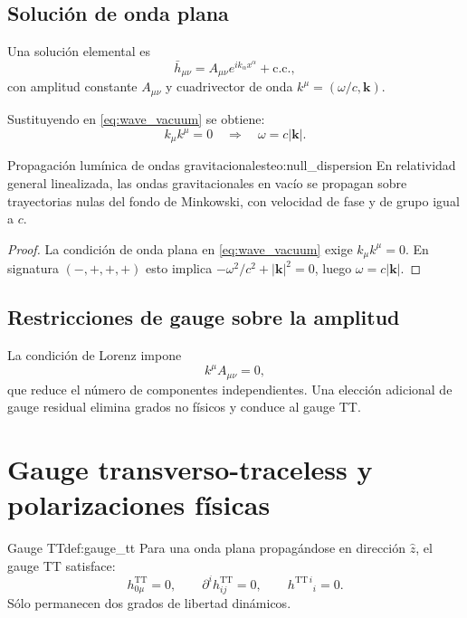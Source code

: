 \subsection{Solución de onda plana}

Una solución elemental es
\begin{equation}
  \bar h_{\mu\nu}=A_{\mu\nu}e^{ik_\alpha x^\alpha}+\text{c.c.},
\end{equation}
con amplitud constante $A_{\mu\nu}$ y cuadrivector de onda $k^\mu=(\omega/c,\mathbf{k})$.

Sustituyendo en \eqref{eq:wave_vacuum} se obtiene:
\begin{equation}
  k_\mu k^\mu=0
  \quad\Longrightarrow\quad
  \omega=c|\mathbf{k}|.
\end{equation}

\begin{teorema}{Propagación lumínica de ondas gravitacionales}{teo:null_dispersion}
En relatividad general linealizada, las ondas gravitacionales en vacío se propagan sobre trayectorias nulas del fondo de Minkowski, con velocidad de fase y de grupo igual a $c$.
\end{teorema}

\begin{proof}
La condición de onda plana en \eqref{eq:wave_vacuum} exige $k_\mu k^\mu=0$. En signatura $(-,+,+,+)$ esto implica $-\omega^2/c^2+|\mathbf{k}|^2=0$, luego $\omega=c|\mathbf{k}|$.
\end{proof}

\subsection{Restricciones de gauge sobre la amplitud}

La condición de Lorenz impone
\begin{equation}
  k^\mu A_{\mu\nu}=0,
\end{equation}
que reduce el número de componentes independientes. Una elección adicional de gauge residual elimina grados no físicos y conduce al gauge TT.

\section{Gauge transverso-traceless y polarizaciones físicas}
\label{sec:gauge_tt}

\begin{definicion}{Gauge TT}{def:gauge_tt}
Para una onda plana propagándose en dirección $\hat{z}$, el gauge TT satisface:
\begin{equation}
  h_{0\mu}^{\mathrm{TT}}=0,
  \qquad
  \partial^i h_{ij}^{\mathrm{TT}}=0,
  \qquad
  h^{\mathrm{TT}\,i}{}_{i}=0.
\end{equation}
Sólo permanecen dos grados de libertad dinámicos.
\end{definicion}

